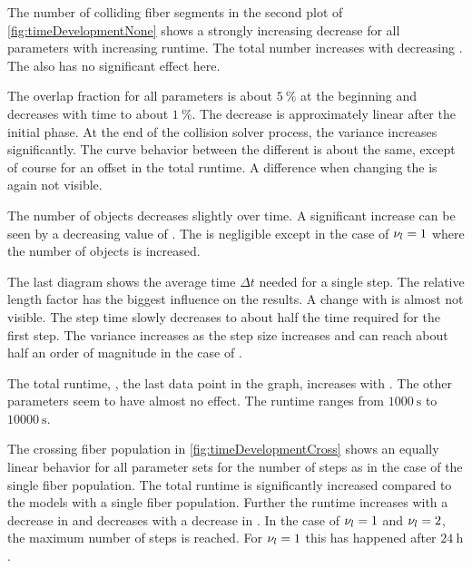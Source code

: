 \par
%
The number of colliding fiber segments in the second plot of \cref{fig:timeDevelopmentNone} shows a strongly increasing decrease for all parameters with increasing runtime.
The total number increases with decreasing \segLengthFactor{}.
The \segRadiusFactor{} also has no significant effect here.
\par
%
The overlap fraction for all parameters is about $\SI{5}{\percent}$ at the beginning and decreases with time to about $\SI{1}{\percent}$.
The decrease is approximately linear after the initial phase.
At the end of the collision solver process, the variance increases significantly.
The curve behavior between the different \segLengthFactor{} is about the same, except of course for an offset in the total runtime.
A difference when changing the \segRadiusFactor{} is again not visible.
\par
%
The number of objects decreases slightly over time.
A significant increase can be seen by a decreasing value of \segLengthFactor{}.
The \segRadiusFactor{} is negligible except in the case of $\textnormal{$\nu_{l}$} = \SI{1}{}$ where the number of objects is increased.
\par
%
The last diagram shows the average time $\Delta t$ needed for a single step.
The relative length factor \segLengthFactor{} has the biggest influence on the results.
A change with \segRadiusFactor{} is almost not visible.
The step time slowly decreases to about half the time required for the first step.
The variance increases as the step size increases and can reach about half an order of magnitude in the case of \segLengthFactor{}.
\par
%
The total runtime, \ie{}, the last data point in the graph, increases with \segLengthFactor{}.
The other parameters seem to have almost no effect.
The runtime ranges from $\SI{1000}{\second}$ to $\SI{10000}{\second}$.
\par
%
The crossing fiber population \cfbs{} in \cref{fig:timeDevelopmentCross} shows an equally linear behavior for all parameter sets for the number of steps as in the case of the single fiber population.
The total runtime is significantly increased compared to the models with a single fiber population.
Further the runtime increases with a decrease in \segLengthFactor{} and decreases with a decrease in \segRadiusFactor{}.
In the case of $\textnormal{$\nu_{l}$} = \SI{1}{}$ and $\textnormal{$\nu_{l}$} = \SI{2}{}$, the maximum number of steps is reached.
For $\textnormal{$\nu_{l}$} = \SI{1}{}$ this has happened after $\SI{24}{\hour}$.
